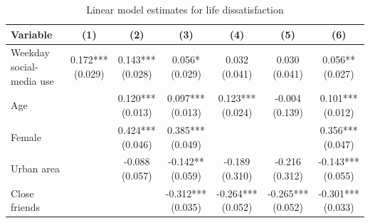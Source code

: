 \begin{table}[!htbp]
\centering
\caption{Linear model estimates for life dissatisfaction}
\label{tab:pooled_ols_life}
\scriptsize
\setlength{\tabcolsep}{3.2pt}
\renewcommand{\arraystretch}{0.9}
\begin{tabular}{p{}cccccc}
\hline
Variable & (1) & (2) & (3) & (4) & (5) & (6) \\
\hline
Weekday social-media use & \shortstack[c]{0.172*** \\[-0.35ex] (0.029)} & \shortstack[c]{0.143*** \\[-0.35ex] (0.028)} & \shortstack[c]{0.056* \\[-0.35ex] (0.029)} & \shortstack[c]{0.032 \\[-0.35ex] (0.041)} & \shortstack[c]{0.030 \\[-0.35ex] (0.041)} & \shortstack[c]{0.056** \\[-0.35ex] (0.027)}
\\
Age &  & \shortstack[c]{0.120*** \\[-0.35ex] (0.013)} & \shortstack[c]{0.097*** \\[-0.35ex] (0.013)} & \shortstack[c]{0.123*** \\[-0.35ex] (0.024)} & \shortstack[c]{-0.004 \\[-0.35ex] (0.139)} & \shortstack[c]{0.101*** \\[-0.35ex] (0.012)}
\\
Female &  & \shortstack[c]{0.424*** \\[-0.35ex] (0.046)} & \shortstack[c]{0.385*** \\[-0.35ex] (0.049)} &  &  & \shortstack[c]{0.356*** \\[-0.35ex] (0.047)}
\\
Urban area &  & \shortstack[c]{-0.088 \\[-0.35ex] (0.057)} & \shortstack[c]{-0.142** \\[-0.35ex] (0.059)} & \shortstack[c]{-0.189 \\[-0.35ex] (0.310)} & \shortstack[c]{-0.216 \\[-0.35ex] (0.312)} & \shortstack[c]{-0.143*** \\[-0.35ex] (0.055)}
\\
Close friends &  &  & \shortstack[c]{-0.312*** \\[-0.35ex] (0.035)} & \shortstack[c]{-0.264*** \\[-0.35ex] (0.052)} & \shortstack[c]{-0.265*** \\[-0.35ex] (0.052)} & \shortstack[c]{-0.301*** \\[-0.35ex] (0.033)}

\end{tabular}
\end{table}
